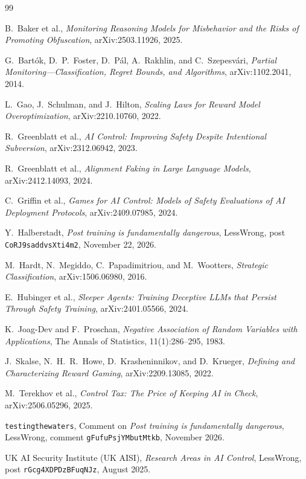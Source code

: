 \documentclass[11pt,a4paper]{article}
\begin{document}
\begin{thebibliography}{99}

B.~Baker et al.,
\emph{Monitoring Reasoning Models for Misbehavior and the Risks of Promoting Obfuscation},
arXiv:2503.11926, 2025.

G.~Bart\'ok, D.~P.~Foster, D.~P\'al, A.~Rakhlin, and C.~Szepesv\'ari,
\emph{Partial Monitoring---Classification, Regret Bounds, and Algorithms},
arXiv:1102.2041, 2014.

L.~Gao, J.~Schulman, and J.~Hilton,
\emph{Scaling Laws for Reward Model Overoptimization},
arXiv:2210.10760, 2022.

R.~Greenblatt et al.,
\emph{AI Control: Improving Safety Despite Intentional Subversion},
arXiv:2312.06942, 2023.

R.~Greenblatt et al.,
\emph{Alignment Faking in Large Language Models},
arXiv:2412.14093, 2024.

C.~Griffin et al.,
\emph{Games for AI Control: Models of Safety Evaluations of AI Deployment Protocols},
arXiv:2409.07985, 2024.

Y.~Halberstadt,
\emph{Post training is fundamentally dangerous},
LessWrong, post \texttt{CoRJ9saddvsXti4m2}, November 22, 2026.

M.~Hardt, N.~Megiddo, C.~Papadimitriou, and M.~Wootters,
\emph{Strategic Classification},
arXiv:1506.06980, 2016.

E.~Hubinger et al.,
\emph{Sleeper Agents: Training Deceptive LLMs that Persist Through Safety Training},
arXiv:2401.05566, 2024.

K.~Joag-Dev and F.~Proschan,
\emph{Negative Association of Random Variables with Applications},
The Annals of Statistics, 11(1):286--295, 1983.

J.~Skalse, N.~H.~R.~Howe, D.~Krasheninnikov, and D.~Krueger,
\emph{Defining and Characterizing Reward Gaming},
arXiv:2209.13085, 2022.

M.~Terekhov et al.,
\emph{Control Tax: The Price of Keeping AI in Check},
arXiv:2506.05296, 2025.

\texttt{testingthewaters},
Comment on \emph{Post training is fundamentally dangerous},
LessWrong, comment \texttt{gFufuPsjYMbutMtkb}, November 2026.

UK AI Security Institute (UK AISI),
\emph{Research Areas in AI Control},
LessWrong, post \texttt{rGcg4XDPDzBFuqNJz}, August 2025.


\end{thebibliography}
\end{document}
